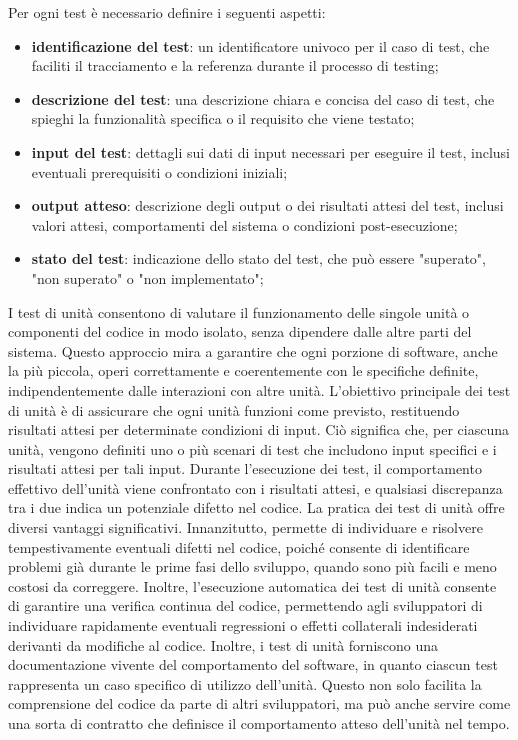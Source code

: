Per ogni test è necessario definire i seguenti aspetti:
\begin{itemize}
	\item \textbf{identificazione del test}: un identificatore univoco per il caso di test, che faciliti il tracciamento e la referenza durante il processo di testing;
	\item \textbf{descrizione del test}: una descrizione chiara e concisa del caso di test, che spieghi la funzionalità specifica o il requisito che viene testato;
	\item \textbf{input del test}: dettagli sui dati di input necessari per eseguire il test, inclusi eventuali prerequisiti o condizioni iniziali;
	\item \textbf{output atteso}: descrizione degli output o dei risultati attesi del test, inclusi valori attesi, comportamenti del sistema o condizioni post-esecuzione;
	\item \textbf{stato del test}: indicazione dello stato del test, che può essere "superato", "non superato" o "non implementato";
\end{itemize}

I test di unità consentono di valutare il funzionamento delle singole unità o componenti del codice in modo isolato, senza dipendere dalle altre parti del sistema. Questo approccio mira a garantire che ogni porzione di software, anche la più piccola, operi correttamente e coerentemente con le specifiche definite, indipendentemente dalle interazioni con altre unità.
L'obiettivo principale dei test di unità è di assicurare che ogni unità funzioni come previsto, restituendo risultati attesi per determinate condizioni di input. Ciò significa che, per ciascuna unità, vengono definiti uno o più scenari di test che includono input specifici e i risultati attesi per tali input. Durante l'esecuzione dei test, il comportamento effettivo dell'unità viene confrontato con i risultati attesi, e qualsiasi discrepanza tra i due indica un potenziale difetto nel codice.
La pratica dei test di unità offre diversi vantaggi significativi. Innanzitutto, permette di individuare e risolvere tempestivamente eventuali difetti nel codice, poiché consente di identificare problemi già durante le prime fasi dello sviluppo, quando sono più facili e meno costosi da correggere. Inoltre, l'esecuzione automatica dei test di unità consente di garantire una verifica continua del codice, permettendo agli sviluppatori di individuare rapidamente eventuali regressioni o effetti collaterali indesiderati derivanti da modifiche al codice.
Inoltre, i test di unità forniscono una documentazione vivente del comportamento del software, in quanto ciascun test rappresenta un caso specifico di utilizzo dell'unità. Questo non solo facilita la comprensione del codice da parte di altri sviluppatori, ma può anche servire come una sorta di contratto che definisce il comportamento atteso dell'unità nel tempo.

